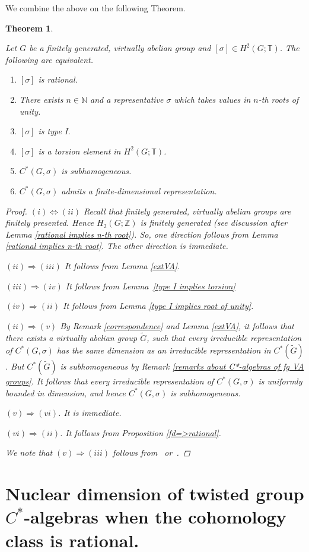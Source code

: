 \documentclass{amsart}
\newtheorem{theorem}{Theorem}[section]
\theoremstyle{definition}
\newcommand{\Z}{\mathbb{Z}}
\newcommand{\N}{\mathbb{N}}
\newcommand{\TT}{\mathbb{T}}
\begin{document}
We combine the above on the following Theorem.
\begin{theorem}\label{characterization of rational cocycle}
    

    Let $G$ be a finitely generated, virtually abelian group and $[\sigma]\in H^2(G;\TT)$. The following are equivalent.
    \begin{enumerate}[label=\roman*.]
        \item $[\sigma]$ is rational.
        \item There exists $n\in \N$ and a representative $\sigma$ which takes values in $n$-th roots of unity.
        \item $[\sigma]$ is type I.
        \item $[\sigma]$ is a torsion element in $H^2(G; \TT)$.
        \item $C^*(G,\sigma)$ is subhomogeneous.
        \item $C^*(G,\sigma)$ admits a finite-dimensional representation.
    \end{enumerate}
    \begin{proof}
    $(i)\Leftrightarrow(ii)$ Recall that finitely generated, virtually abelian groups are finitely presented. Hence $H_2(G;\Z)$ is finitely generated (see discussion after Lemma \ref{rational implies n-th root}). So, one direction follows from Lemma \ref{rational implies n-th root}. The other direction is immediate. \par
    $(ii)\Rightarrow (iii)$ It follows from Lemma \ref{extVA}. \par
    \par
    $(iii)\Rightarrow(iv)$ It follows from Lemma~\ref{type I implies torsion}\par
    $(iv)\Rightarrow (ii)$ It follows from Lemma \ref{type I implies root of unity}. \par
    $(ii)\Rightarrow (v)$ By Remark \ref{correspondence} and Lemma \ref{extVA}, it follows that there exists a virtually abelian group $\widetilde{G}$, such that every irreducible representation of $C^*(G,\sigma)$ has the same dimension as an irreducible representation in $C^*(\widetilde{G})$. But $C^*(\widetilde{G})$ is subhomogeneous by Remark \ref{remarks about C*-algebras of fg VA groups}. It follows that every irreducible representation of $C^*(G,\sigma)$ is uniformly bounded in dimension, and hence $C^*(G,\sigma)$ is subhomogeneous. \par
    $(v)\Rightarrow (vi)$. It is immediate. \par
    $(vi)\Rightarrow (ii)$. It follows from Proposition \ref{fd=>rational}.

We note that $(v)\Rightarrow(iii)$ follows from~\cite{Ho1981} or~\cite{kleppner_type_I_cocycles}.
    \end{proof}


\section{Nuclear dimension of twisted group $C^*$-algebras when the cohomology class is rational.}
\end{theorem}
\end{document}
